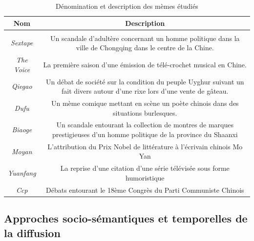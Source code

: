 \begin{table}[t]
  \begin{tabulary}{\textwidth}{c|C}

    \textbf{Nom} &
    \textbf{Description}\\
    \hline \\[-1.5ex]
    \textit{S}\textit{extape}\textit{ } &
    Un scandale d{\textquoteright}adult\`ere concernant un homme politique
    dans la ville de Chongqing dans le centre de la Chine.\\[2ex]

    \textit{The Voice } &
    La premi\`ere saison d{\textquoteright}une \'emission de
    t\'el\'e-crochet musical en Chine.\\[2ex]

    \textit{Qiegao } &
    Un d\'ebat de soci\'et\'e sur la condition du peuple Uyghur suivant un
    fait divers autour d{\textquoteright}une rixe lors
    d{\textquoteright}une vente de g\^ateau.\\[2ex]

    \textit{Dufu} &
    Un m\`eme comique mettant en sc\`ene un po\`ete chinois dans des
    situations burlesques.\\[2ex]

    \textit{Biaoge} &
    Un scandale entourant la collection de montres de marques prestigieuses
    d{\textquoteright}un homme politique de la province du Shaanxi \\[2ex]

    \textit{Moyan} &
    L{\textquoteright}attribution du Prix Nobel de litt\'erature \`a
    l{\textquoteright}\'ecrivain chinois Mo Yan\\[2ex]

    \textit{Yuanfang} &
    La reprise d{\textquoteright}une citation d{\textquoteright}une s\'erie
    t\'el\'evis\'ee sous forme humoristique\\[2ex]

    \textit{Ccp} &
    D\'ebats entourant le 18\`eme Congr\`es du Parti Communiste Chinois\\[2ex]

  \end{tabulary}
  \caption{D\'enomination et description des m\`emes \'etudi\'es}
\end{table}


\subsection[Approches socio{}-s\'emantiques et temporelles de la diffusion]{Approches socio-s\'emantiques et temporelles de la diffusion}


